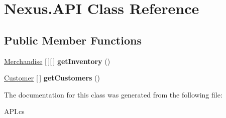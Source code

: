 \hypertarget{class_nexus_1_1_a_p_i}{}\section{Nexus.\+A\+PI Class Reference}
\label{class_nexus_1_1_a_p_i}
\subsection*{Public Member Functions}
\begin{DoxyCompactItemize}
\item 
\mbox{\label{class_nexus_1_1_a_p_i_a7596763d02c150be990a98c3adba3cb9}} 
\mbox{\hyperlink{class_nexus_1_1_merchandise}{Merchandise}} \mbox{[}$\,$\mbox{]}\mbox{[}$\,$\mbox{]} {\bfseries get\+Inventory} ()
\item 
\mbox{\label{class_nexus_1_1_a_p_i_af88bb906755dfe745f3cbe94468b059e}} 
\mbox{\hyperlink{class_nexus_1_1_customer}{Customer}} \mbox{[}$\,$\mbox{]} {\bfseries get\+Customers} ()
\end{DoxyCompactItemize}


The documentation for this class was generated from the following file\+:\begin{DoxyCompactItemize}
\item 
A\+P\+I.\+cs\end{DoxyCompactItemize}
